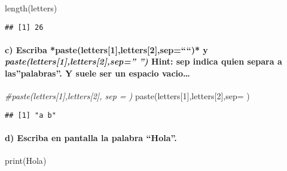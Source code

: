 \documentclass[
]{article}
\newenvironment{Shaded}{\begin{snugshade}}{\end{snugshade}}
\newcommand{\AttributeTok}[1]{\textcolor[rgb]{0.77,0.63,0.00}{#1}}
\newcommand{\CommentTok}[1]{\textcolor[rgb]{0.56,0.35,0.01}{\textit{#1}}}
\newcommand{\DecValTok}[1]{\textcolor[rgb]{0.00,0.00,0.81}{#1}}
\newcommand{\FunctionTok}[1]{\textcolor[rgb]{0.00,0.00,0.00}{#1}}
\newcommand{\NormalTok}[1]{#1}
\newcommand{\StringTok}[1]{\textcolor[rgb]{0.31,0.60,0.02}{#1}}
\begin{document}
\begin{Shaded}
\begin{Highlighting}[]
\FunctionTok{length}\NormalTok{(letters)}
\end{Highlighting}
\end{Shaded}

\begin{verbatim}
## [1] 26
\end{verbatim}

\hypertarget{c-escriba-pasteletters1letters2sep-y-pasteletters1letters2sep-hint-sep-indica-quien-separa-a-laspalabras.-y-suele-ser-un-espacio-vacio}{%
\paragraph{\texorpdfstring{c) Escriba
*paste(letters{[}1{]},letters{[}2{]},sep=````)* y
\emph{paste(letters{[}1{]},letters{[}2{]},sep='' '')} Hint: sep indica
quien separa a las''palabras''. Y suele ser un espacio
vacio\ldots{}}{c) Escriba *paste(letters{[}1{]},letters{[}2{]},sep=``\,``)* y paste(letters{[}1{]},letters{[}2{]},sep='' '') Hint: sep indica quien separa a las''palabras''. Y suele ser un espacio vacio\ldots{}}}\label{c-escriba-pasteletters1letters2sep-y-pasteletters1letters2sep-hint-sep-indica-quien-separa-a-laspalabras.-y-suele-ser-un-espacio-vacio}}

\begin{Shaded}
\begin{Highlighting}[]
\CommentTok{\#paste(letters[1],letters[2], sep = \textquotesingle{}\textquotesingle{})}
\FunctionTok{paste}\NormalTok{(letters[}\DecValTok{1}\NormalTok{],letters[}\DecValTok{2}\NormalTok{],}\AttributeTok{sep=}\StringTok{\textquotesingle{} \textquotesingle{}}\NormalTok{)}
\end{Highlighting}
\end{Shaded}

\begin{verbatim}
## [1] "a b"
\end{verbatim}

\hypertarget{d-escriba-en-pantalla-la-palabra-hola.}{%
\paragraph{d) Escriba en pantalla la palabra
``Hola''.}\label{d-escriba-en-pantalla-la-palabra-hola.}}

\begin{Shaded}
\begin{Highlighting}[]
\FunctionTok{print}\NormalTok{(}\StringTok{\textquotesingle{}Hola\textquotesingle{}}\NormalTok{)}
\end{Highlighting}
\end{Shaded}
\end{document}
